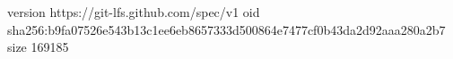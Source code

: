 version https://git-lfs.github.com/spec/v1
oid sha256:b9fa07526e543b13c1ee6eb8657333d500864e7477cf0b43da2d92aaa280a2b7
size 169185
